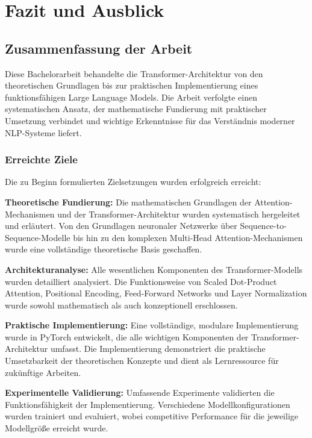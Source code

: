 \chapter{Fazit und Ausblick}
\label{ch:conclusion}

\section{Zusammenfassung der Arbeit}

Diese Bachelorarbeit behandelte die Transformer-Architektur von den theoretischen Grundlagen bis zur praktischen Implementierung eines funktionsfähigen Large Language Models. Die Arbeit verfolgte einen systematischen Ansatz, der mathematische Fundierung mit praktischer Umsetzung verbindet und wichtige Erkenntnisse für das Verständnis moderner NLP-Systeme liefert.

\subsection{Erreichte Ziele}

Die zu Beginn formulierten Zielsetzungen wurden erfolgreich erreicht:

\textbf{Theoretische Fundierung:} Die mathematischen Grundlagen der Attention-Mechanismen und der Transformer-Architektur wurden systematisch hergeleitet und erläutert. Von den Grundlagen neuronaler Netzwerke über Sequence-to-Sequence-Modelle bis hin zu den komplexen Multi-Head Attention-Mechanismen wurde eine vollständige theoretische Basis geschaffen.

\textbf{Architekturanalyse:} Alle wesentlichen Komponenten des Transformer-Modells wurden detailliert analysiert. Die Funktionsweise von Scaled Dot-Product Attention, Positional Encoding, Feed-Forward Networks und Layer Normalization wurde sowohl mathematisch als auch konzeptionell erschlossen.

\textbf{Praktische Implementierung:} Eine vollständige, modulare Implementierung wurde in PyTorch entwickelt, die alle wichtigen Komponenten der Transformer-Architektur umfasst. Die Implementierung demonstriert die praktische Umsetzbarkeit der theoretischen Konzepte und dient als Lernressource für zukünftige Arbeiten.

\textbf{Experimentelle Validierung:} Umfassende Experimente validierten die Funktionsfähigkeit der Implementierung. Verschiedene Modellkonfigurationen wurden trainiert und evaluiert, wobei competitive Performance für die jeweilige Modellgröße erreicht wurde.

